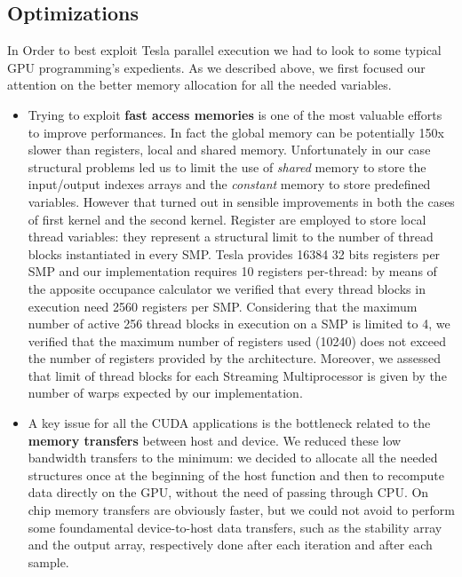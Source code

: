 \subsection{Optimizations}
In Order to best exploit Tesla parallel execution we had to look to some typical GPU programming's expedients.
As we described above, we first focused our attention on the better memory allocation for all the needed variables.
\begin{itemize}
 \item Trying to exploit \textbf{fast access memories} is one of the most valuable efforts to improve performances.
In fact the global memory can be potentially 150x slower than registers, local and shared memory.\newline
Unfortunately in our case structural problems led us to limit the use of \textit{shared} memory to store the input/output indexes arrays and  the
\textit{constant} memory to store predefined variables. However that turned out in sensible improvements in both the cases of first kernel and
the second kernel. Register are employed to store local thread variables: they represent a structural limit to the number of thread blocks 
instantiated in every SMP. Tesla provides 16384 32 bits registers per SMP and our implementation requires 10 registers per-thread: by means of the 
apposite occupance calculator we verified that every thread blocks in execution need 2560 registers per SMP.
Considering that the maximum number of active 256 thread blocks in execution on a SMP is limited to 4, we verified that the maximum 
number of registers used (10240) does not exceed the number of registers provided by the architecture. Moreover, we assessed that limit
of thread blocks for each Streaming Multiprocessor is given by the number of warps expected by our implementation.

\item A key issue for all the CUDA applications is the bottleneck related to the \textbf{memory transfers} between host and device.
We reduced these low bandwidth transfers to the minimum: we decided to allocate all the needed structures once at the beginning of
the host function and then to recompute data directly on the GPU, without the need of passing through CPU. On chip memory transfers are
obviously faster, but we could not avoid to perform some foundamental device-to-host data transfers, such as the stability array and the output
array, respectively done after each iteration and after each sample.


\end{itemize}
